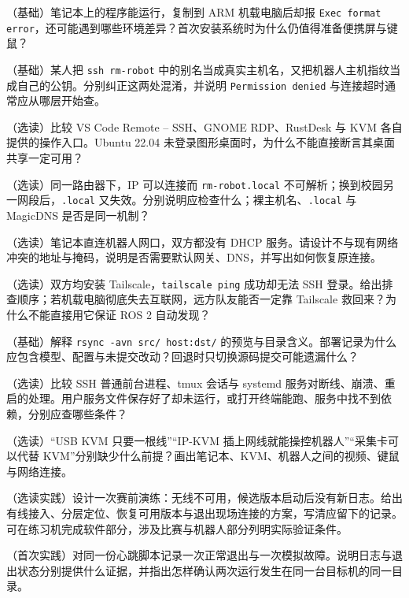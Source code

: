 \begin{problemset}
  \item\label{prob:v1-deploy-1} （基础）笔记本上的程序能运行，复制到 ARM 机载电脑后却报 \texttt{Exec format error}，还可能遇到哪些环境差异？首次安装系统时为什么仍值得准备便携屏与键鼠？
  \item\label{prob:v1-deploy-2} （基础）某人把 \texttt{ssh rm-robot} 中的别名当成真实主机名，又把机器人主机指纹当成自己的公钥。分别纠正这两处混淆，并说明 \texttt{Permission denied} 与连接超时通常应从哪层开始查。
  \item\label{prob:v1-deploy-3} （选读）比较 VS Code Remote -- SSH、GNOME RDP、RustDesk 与 KVM 各自提供的操作入口。Ubuntu 22.04 未登录图形桌面时，为什么不能直接断言其桌面共享一定可用？
  \item\label{prob:v1-deploy-4} （选读）同一路由器下，IP 可以连接而 \texttt{rm-robot.local} 不可解析；换到校园另一网段后，\texttt{.local} 又失效。分别说明应检查什么；裸主机名、\texttt{.local} 与 MagicDNS 是否是同一机制？
  \item\label{prob:v1-deploy-5} （选读）笔记本直连机器人网口，双方都没有 DHCP 服务。请设计不与现有网络冲突的地址与掩码，说明是否需要默认网关、DNS，并写出如何恢复原连接。
  \item\label{prob:v1-deploy-6} （选读）双方均安装 Tailscale，\texttt{tailscale ping} 成功却无法 SSH 登录。给出排查顺序；若机载电脑彻底失去互联网，远方队友能否一定靠 Tailscale 救回来？为什么不能直接用它保证 ROS 2 自动发现？
  \item\label{prob:v1-deploy-7} （基础）解释 \texttt{rsync -avn src/ host:dst/} 的预览与目录含义。部署记录为什么应包含模型、配置与未提交改动？回退时只切换源码提交可能遗漏什么？
  \item\label{prob:v1-deploy-8} （选读）比较 SSH 普通前台进程、tmux 会话与 systemd 服务对断线、崩溃、重启的处理。用户服务文件保存好了却未运行，或打开终端能跑、服务中找不到依赖，分别应查哪些条件？
  \item\label{prob:v1-deploy-9} （选读）“USB KVM 只要一根线”“IP-KVM 插上网线就能操控机器人”“采集卡可以代替 KVM”分别缺少什么前提？画出笔记本、KVM、机器人之间的视频、键鼠与网络连接。
  \item\label{prob:v1-deploy-10} （选读实践）设计一次赛前演练：无线不可用，候选版本启动后没有新日志。给出有线接入、分层定位、恢复可用版本与退出现场连接的方案，写清应留下的记录。可在练习机完成软件部分，涉及比赛与机器人部分列明实际验证条件。
  \item\label{prob:v1-deploy-log} （首次实践）对同一份心跳脚本记录一次正常退出与一次模拟故障。说明日志与退出状态分别提供什么证据，并指出怎样确认两次运行发生在同一台目标机的同一目录。
\end{problemset}

